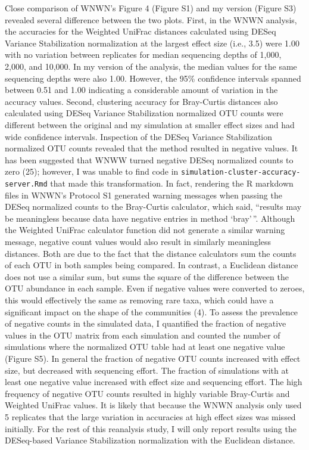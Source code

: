 \documentclass[
]{article}
\begin{document}
Close comparison of WNWN's Figure 4 (Figure S1) and my version (Figure
S3) revealed several difference between the two plots. First, in the
WNWN analysis, the accuracies for the Weighted UniFrac distances
calculated using DESeq Variance Stabilization normalization at the
largest effect size (i.e., 3.5) were 1.00 with no variation between
replicates for median sequencing depths of 1,000, 2,000, and 10,000. In
my version of the analysis, the median values for the same sequencing
depths were also 1.00. However, the 95\% confidence intervals spanned
between 0.51 and 1.00 indicating a considerable amount of variation in
the accuracy values. Second, clustering accuracy for Bray-Curtis
distances also calculated using DESeq Variance Stabilization normalized
OTU counts were different between the original and my simulation at
smaller effect sizes and had wide confidence intervals. Inspection of
the DESeq Variance Stabilization normalized OTU counts revealed that the
method resulted in negative values. It has been suggested that WNWW
turned negative DESeq normalized counts to zero (25); however, I was
unable to find code in \texttt{simulation-cluster-accuracy-server.Rmd}
that made this transformation. In fact, rendering the R markdown files
in WNWN's Protocol S1 generated warning messages when passing the DESeq
normalized counts to the Bray-Curtis calculator, which said, ``results
may be meaningless because data have negative entries in method
`bray'\,''. Although the Weighted UniFrac calculator function did not
generate a similar warning message, negative count values would also
result in similarly meaningless distances. Both are due to the fact that
the distance calculators sum the counts of each OTU in both samples
being compared. In contrast, a Euclidean distance does not use a similar
sum, but sums the square of the difference between the OTU abundance in
each sample. Even if negative values were converted to zeroes, this
would effectively the same as removing rare taxa, which could have a
significant impact on the shape of the communities (4). To assess the
prevalence of negative counts in the simulated data, I quantified the
fraction of negative values in the OTU matrix from each simulation and
counted the number of simulations where the normalized OTU table had at
least one negative value (Figure S5). In general the fraction of
negative OTU counts increased with effect size, but decreased with
sequencing effort. The fraction of simulations with at least one
negative value increased with effect size and sequencing effort. The
high frequency of negative OTU counts resulted in highly variable
Bray-Curtis and Weighted UniFrac values. It is likely that because the
WNWN analysis only used 5 replicates that the large variation in
accuracies at high effect sizes was missed initially. For the rest of
this reanalysis study, I will only report results using the DESeq-based
Variance Stabilization normalization with the Euclidean distance.
\end{document}
